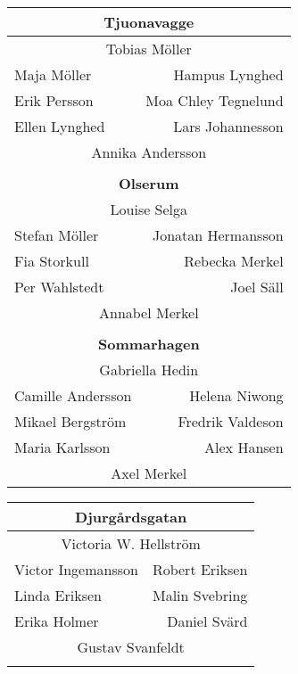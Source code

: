 \documentclass[a5paper]{article}
\begin{document}
\begin{landscape}
\begin{center}
\begin{tabular}{  l r }
			\multicolumn{2}{c}{\textbf{Tjuonavagge			}} \\ \hline								
			\multicolumn{2}{c}{\rule{0pt}{2ex}	Tobias Möller			}   \\								
			Maja Möller	&	Hampus Lynghed	\\								
			Erik Persson	&	Moa Chley Tegnelund	\\								
			Ellen Lynghed	&	Lars Johannesson	\\								
			\multicolumn{2}{c}{	Annika Andersson			}   \\								
			\\								
			
			\multicolumn{2}{c}{\textbf{Olserum			}} \\ \hline								
			\multicolumn{2}{c}{\rule{0pt}{2ex}	Louise Selga			}   \\								
			Stefan Möller	&	Jonatan Hermansson	\\								
			Fia Storkull	&	Rebecka Merkel	\\								
			Per Wahlstedt	&	Joel Säll	\\								
			\multicolumn{2}{c}{	Annabel Merkel			}   \\								
			\\								
			
			\multicolumn{2}{c}{\textbf{Sommarhagen			}} \\ \hline								
			\multicolumn{2}{c}{\rule{0pt}{2ex}	Gabriella Hedin			}   \\								
			Camille Andersson	&	Helena Niwong	\\								
			Mikael Bergström	&	Fredrik Valdeson	\\								
			Maria Karlsson	&	Alex Hansen	\\								
			\multicolumn{2}{c}{	Axel Merkel			}   \\								
			
		\end{tabular}												
		\quad \hspace*{2cm}												
		\begin{tabular}{  l r }												
			
			\multicolumn{2}{c}{\textbf{Djurgårdsgatan			}} \\ \hline								
			\multicolumn{2}{c}{\rule{0pt}{2ex}	Victoria W. Hellström			}   \\								
			Victor Ingemansson	&	Robert Eriksen	\\								
			Linda Eriksen	&	Malin Svebring	\\								
			Erika Holmer	&	Daniel Svärd	\\								
			\multicolumn{2}{c}{	Gustav Svanfeldt			}   \\								
			\\								
			

\end{tabular}
\end{center}
\end{landscape}
\end{document}
